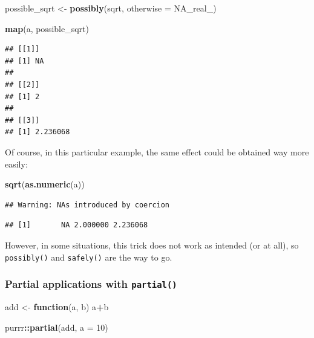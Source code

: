\documentclass[]{gitbook}
\newenvironment{Shaded}{\begin{snugshade}}{\end{snugshade}}
\newcommand{\ControlFlowTok}[1]{\textcolor[rgb]{0.13,0.29,0.53}{\textbf{#1}}}
\newcommand{\DataTypeTok}[1]{\textcolor[rgb]{0.13,0.29,0.53}{#1}}
\newcommand{\DecValTok}[1]{\textcolor[rgb]{0.00,0.00,0.81}{#1}}
\newcommand{\KeywordTok}[1]{\textcolor[rgb]{0.13,0.29,0.53}{\textbf{#1}}}
\newcommand{\NormalTok}[1]{#1}
\newcommand{\OperatorTok}[1]{\textcolor[rgb]{0.81,0.36,0.00}{\textbf{#1}}}
\newcommand{\OtherTok}[1]{\textcolor[rgb]{0.56,0.35,0.01}{#1}}
\newcommand{\StringTok}[1]{\textcolor[rgb]{0.31,0.60,0.02}{#1}}
\begin{document}
\begin{Shaded}
\begin{Highlighting}[]
\NormalTok{possible_sqrt <-}\StringTok{ }\KeywordTok{possibly}\NormalTok{(sqrt, }\DataTypeTok{otherwise =} \OtherTok{NA_real_}\NormalTok{)}

\KeywordTok{map}\NormalTok{(a, possible_sqrt)}
\end{Highlighting}
\end{Shaded}

\begin{verbatim}
## [[1]]
## [1] NA
## 
## [[2]]
## [1] 2
## 
## [[3]]
## [1] 2.236068
\end{verbatim}

Of course, in this particular example, the same effect could be obtained way more easily:

\begin{Shaded}
\begin{Highlighting}[]
\KeywordTok{sqrt}\NormalTok{(}\KeywordTok{as.numeric}\NormalTok{(a))}
\end{Highlighting}
\end{Shaded}

\begin{verbatim}
## Warning: NAs introduced by coercion
\end{verbatim}

\begin{verbatim}
## [1]       NA 2.000000 2.236068
\end{verbatim}

However, in some situations, this trick does not work as intended (or at all), so \texttt{possibly()} and
\texttt{safely()} are the way to go.

\hypertarget{partial-applications-with-partial}{%
\subsubsection{\texorpdfstring{Partial applications with \texttt{partial()}}{Partial applications with partial()}}\label{partial-applications-with-partial}}

\begin{Shaded}
\begin{Highlighting}[]
\NormalTok{add <-}\StringTok{ }\ControlFlowTok{function}\NormalTok{(a, b) a}\OperatorTok{+}\NormalTok{b}
\end{Highlighting}
\end{Shaded}

\begin{Shaded}
\begin{Highlighting}[]
\NormalTok{purrr}\OperatorTok{::}\KeywordTok{partial}\NormalTok{(add, }\DataTypeTok{a =} \DecValTok{10}\NormalTok{)}
\end{Highlighting}
\end{Shaded}
\end{document}
